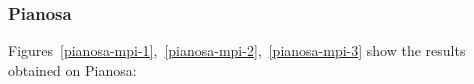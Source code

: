 \subsubsection*{Pianosa}
\label{test-env-pianosa}
Figures~\ref{pianosa-mpi-1},~\ref{pianosa-mpi-2},~\ref{pianosa-mpi-3} show the results obtained on Pianosa:
%
%
%


